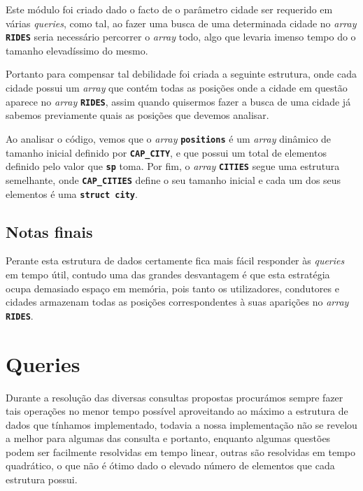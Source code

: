 \documentclass[12pt,a4paper]{report}
\begin{document}
Este módulo foi criado dado o facto de o parâmetro cidade ser requerido em várias \textit{queries}, como tal, ao fazer uma busca de uma determinada cidade no \textit{array} \textbf{\small\texttt{RIDES}} seria necessário percorrer o \textit{array} todo, algo que levaria imenso tempo do o tamanho elevadíssimo do mesmo.

Portanto para compensar tal debilidade foi criada a seguinte estrutura, onde cada cidade possui um \textit{array} que contém todas as posições onde a cidade em questão aparece no \textit{array} \textbf{\small\texttt{RIDES}}, assim quando quisermos fazer a busca de uma cidade já sabemos previamente quais as posições que devemos analisar.



Ao analisar o código, vemos que o \textit{array} \textbf{\small\texttt{positions}} é um \textit{array} dinâmico de tamanho inicial definido por \textbf{\small\texttt{CAP\_CITY}}, e que possui um total de elementos definido pelo valor que \textbf{\small\texttt{sp}} toma. Por fim, o \textit{array} \textbf{\small\texttt{CITIES}}  segue uma estrutura semelhante, onde \textbf{\small\texttt{CAP\_CITIES}} define o seu tamanho inicial e cada um dos seus elementos é uma \textbf{\small\texttt{struct city}}.

\section{Notas finais}

Perante esta estrutura de dados certamente fica mais fácil responder às \textit{queries} em tempo útil, contudo uma das grandes desvantagem é que esta estratégia ocupa demasiado espaço em memória, pois tanto os utilizadores, condutores e cidades armazenam todas as posições correspondentes à suas aparições no \textit{array} \textbf{\small\texttt{RIDES}}.


\chapter{Queries}

Durante a resolução das diversas consultas propostas procurámos sempre fazer tais operações no menor tempo possível aproveitando ao máximo a estrutura de dados que tínhamos implementado, todavia a nossa implementação não se revelou a melhor para algumas das consulta e portanto, enquanto algumas questões podem ser facilmente resolvidas em tempo linear, outras são resolvidas em tempo quadrático, o que não é ótimo dado o elevado número de elementos que cada estrutura possui.
\end{document}
